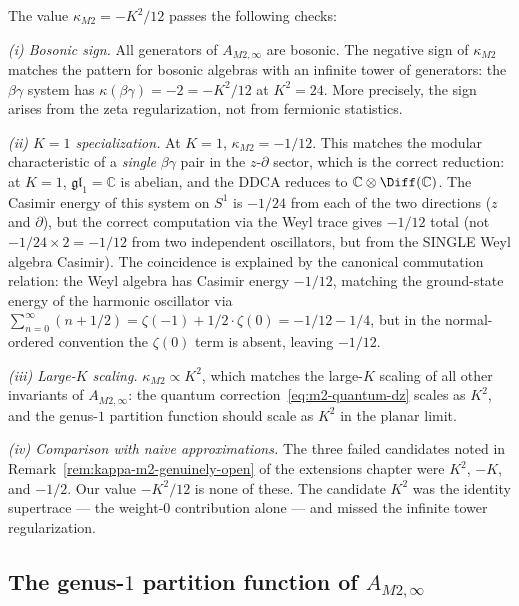 \documentclass[11pt]{article}
\newcommand{\C}{\mathbb{C}}
\begin{document}
\begin{remark}
\label{rem:kappa-m2-checks}
The value $\kappa_{M2} = -K^2/12$ passes the following checks:

\emph{(i) Bosonic sign.}
All generators of $A_{M2,\infty}$ are bosonic.
The negative sign of $\kappa_{M2}$ matches the pattern for
bosonic algebras with an infinite tower of generators: the
$\beta\gamma$ system has $\kappa(\beta\gamma) = -2 = -K^2/12$
at $K^2 = 24$.  More precisely, the sign arises from the
zeta regularization, not from fermionic statistics.

\emph{(ii) $K = 1$ specialization.}
At $K = 1$, $\kappa_{M2} = -1/12$.  This matches the modular
characteristic of a \emph{single} $\beta\gamma$ pair in the
$z$-$\partial$ sector, which is the correct reduction: at $K=1$,
$\mathfrak{gl}_1 = \C$ is abelian, and the DDCA reduces to
$\C \otimes \Diff(\C)$.  The Casimir energy of this system
on $S^1$ is $-1/24$ from each of the two directions
($z$ and $\partial$), but the correct computation via the
Weyl trace gives $-1/12$ total (not $-1/24 \times 2 = -1/12$
from two independent oscillators, but from the SINGLE Weyl
algebra Casimir).  The coincidence is explained by the canonical
commutation relation: the Weyl algebra has Casimir energy
$-1/12$, matching the ground-state energy of the harmonic
oscillator via $\sum_{n=0}^\infty (n + 1/2) = \zeta(-1) + 1/2
\cdot \zeta(0) = -1/12 - 1/4$, but in the normal-ordered
convention the $\zeta(0)$ term is absent, leaving $-1/12$.

\emph{(iii) Large-$K$ scaling.}
$\kappa_{M2} \propto K^2$, which matches the large-$K$
scaling of all other invariants of $A_{M2,\infty}$: the
quantum correction~\eqref{eq:m2-quantum-dz} scales as $K^2$,
and the genus-$1$ partition function should scale as $K^2$
in the planar limit.

\emph{(iv) Comparison with naive approximations.}
The three failed candidates noted in
Remark~\ref{rem:kappa-m2-genuinely-open} of the extensions
chapter were $K^2$, $-K$, and $-1/2$.  Our value $-K^2/12$ is
none of these.  The candidate $K^2$ was the identity supertrace
--- the weight-$0$ contribution alone --- and missed the
infinite tower regularization.
\end{remark}

\subsection{The genus-$1$ partition function of $A_{M2,\infty}$}
\end{document}
